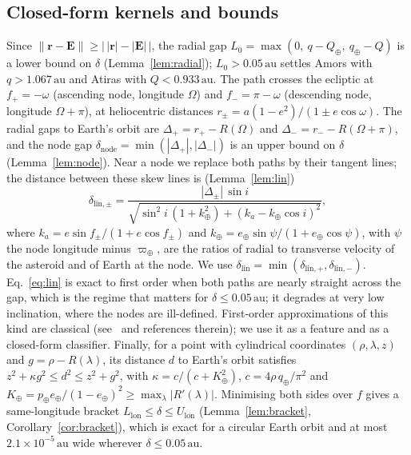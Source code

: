 \documentclass[conference]{IEEEtran}
\newcommand{\au}{\,\mathrm{au}}
\begin{document}
\subsection{Closed-form kernels and bounds}
\label{sec:closed}
Since $\lVert\mathbf{r}-\mathbf{E}\rVert \ge \bigl|\,|\mathbf{r}|-|\mathbf{E}|\,\bigr|$, the radial gap $L_0 = \max(0,\ q - Q_\oplus,\ q_\oplus - Q)$ is a lower bound on $\delta$ (Lemma~\ref{lem:radial}); $L_0 > 0.05\au$ settles Amors with $q > 1.067\au$ and Atiras with $Q < 0.933\au$. The path crosses the ecliptic at $f_+ = -\omega$ (ascending node, longitude $\Omega$) and $f_- = \pi - \omega$ (descending node, longitude $\Omega + \pi$), at heliocentric distances $r_\pm = a(1-e^2)/(1 \pm e\cos\omega)$. The radial gaps to Earth's orbit are $\Delta_+ = r_+ - R(\Omega)$ and $\Delta_- = r_- - R(\Omega + \pi)$, and the node gap $\delta_{\mathrm{node}} = \min(|\Delta_+|, |\Delta_-|)$ is an upper bound on $\delta$ (Lemma~\ref{lem:node}). Near a node we replace both paths by their tangent lines; the distance between these skew lines is (Lemma~\ref{lem:lin})
\begin{equation}
\delta_{\mathrm{lin},\pm} = \frac{|\Delta_\pm|\,\sin i}{\sqrt{\sin^2 i\,(1 + k_\oplus^2) + (k_a - k_\oplus\cos i)^2}},
\label{eq:lin}
\end{equation}
where $k_a = e\sin f_\pm / (1 + e\cos f_\pm)$ and $k_\oplus = e_\oplus\sin\psi/(1 + e_\oplus\cos\psi)$, with $\psi$ the node longitude minus $\varpi_\oplus$, are the ratios of radial to transverse velocity of the asteroid and of Earth at the node. We use $\delta_{\mathrm{lin}} = \min(\delta_{\mathrm{lin},+}, \delta_{\mathrm{lin},-})$. Eq.~\eqref{eq:lin} is exact to first order when both paths are nearly straight across the gap, which is the regime that matters for $\delta \le 0.05\au$; it degrades at very low inclination, where the nodes are ill-defined. First-order approximations of this kind are classical (see~\cite{hedo2018,hedo2020} and references therein); we use it as a feature and as a closed-form classifier. Finally, for a point with cylindrical coordinates $(\rho, \lambda, z)$ and $g = \rho - R(\lambda)$, its distance $d$ to Earth's orbit satisfies $z^2 + \kappa g^2 \le d^2 \le z^2 + g^2$, with $\kappa = c/(c + K_\oplus^2)$, $c = 4\rho\,q_\oplus/\pi^2$ and $K_\oplus = p_\oplus e_\oplus/(1 - e_\oplus)^2 \ge \max_\lambda |R'(\lambda)|$. Minimising both sides over $f$ gives a same-longitude bracket $L_{\mathrm{lon}} \le \delta \le U_{\mathrm{lon}}$ (Lemma~\ref{lem:bracket}, Corollary~\ref{cor:bracket}), which is exact for a circular Earth orbit and at most $2.1\times10^{-5}\au$ wide wherever $\delta \le 0.05\au$.
\end{document}
